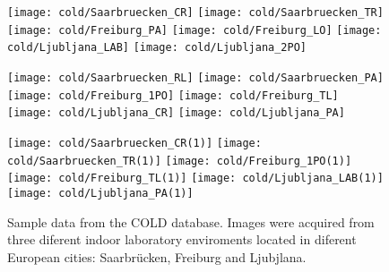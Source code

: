 
\begin{figure}
\begin{center}
\texttt{[image: cold/Saarbruecken\_CR]}
\texttt{[image: cold/Saarbruecken\_TR]}
\texttt{[image: cold/Freiburg\_PA]}
\texttt{[image: cold/Freiburg\_LO]}
\texttt{[image: cold/Ljubljana\_LAB]}
\texttt{[image: cold/Ljubljana\_2PO]}

\texttt{[image: cold/Saarbruecken\_RL]}
\texttt{[image: cold/Saarbruecken\_PA]}
\texttt{[image: cold/Freiburg\_1PO]}
\texttt{[image: cold/Freiburg\_TL]}
\texttt{[image: cold/Ljubljana\_CR]}
\texttt{[image: cold/Ljubljana\_PA]}

\texttt{[image: cold/Saarbruecken\_CR(1)]}
\texttt{[image: cold/Saarbruecken\_TR(1)]}
\texttt{[image: cold/Freiburg\_1PO(1)]}
\texttt{[image: cold/Freiburg\_TL(1)]}
\texttt{[image: cold/Ljubljana\_LAB(1)]}
\texttt{[image: cold/Ljubljana\_PA(1)]}
\end{center}
\caption{Sample data from the COLD database. Images were acquired from three diferent indoor laboratory enviroments located in diferent European cities: Saarbrücken, Freiburg and Ljubjlana.}
\end{figure}

